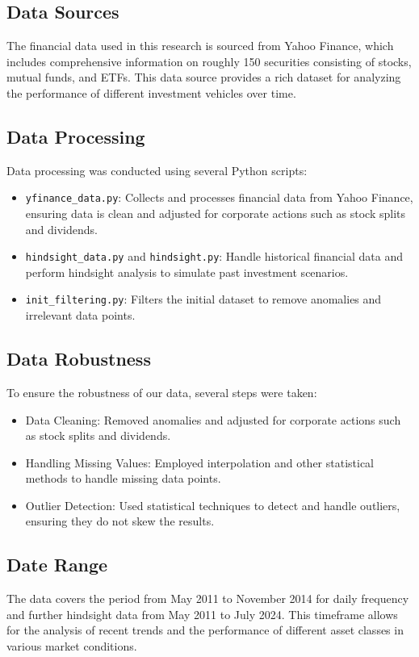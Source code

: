 \subsection{Data Sources}
The financial data used in this research is sourced from Yahoo Finance, which includes comprehensive information on roughly 150 securities consisting of stocks, mutual funds, and ETFs. This data source provides a rich dataset for analyzing the performance of different investment vehicles over time.

\subsection{Data Processing}
Data processing was conducted using several Python scripts:
\begin{itemize}
    \item \texttt{yfinance\_data.py}: Collects and processes financial data from Yahoo Finance, ensuring data is clean and adjusted for corporate actions such as stock splits and dividends.
    \item \texttt{hindsight\_data.py} and \texttt{hindsight.py}: Handle historical financial data and perform hindsight analysis to simulate past investment scenarios.
    \item \texttt{init\_filtering.py}: Filters the initial dataset to remove anomalies and irrelevant data points.
\end{itemize}

\subsection{Data Robustness}
To ensure the robustness of our data, several steps were taken:
\begin{itemize}
    \item Data Cleaning: Removed anomalies and adjusted for corporate actions such as stock splits and dividends.
    \item Handling Missing Values: Employed interpolation and other statistical methods to handle missing data points.
    \item Outlier Detection: Used statistical techniques to detect and handle outliers, ensuring they do not skew the results.
\end{itemize}

\subsection{Date Range}
The data covers the period from May 2011 to November 2014 for daily frequency and further hindsight data from May 2011 to July 2024. This timeframe allows for the analysis of recent trends and the performance of different asset classes in various market conditions.

